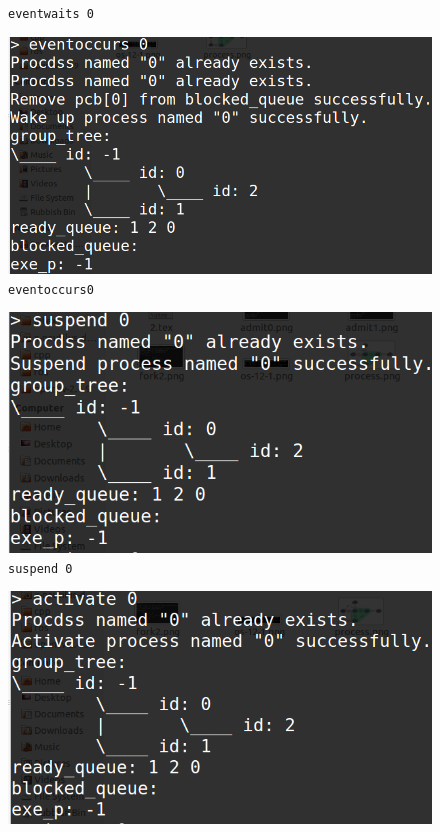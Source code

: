 \documentclass[11pt]{article}
\begin{document}
\begin{center}
\begin{figure}[htbp]
\caption{\texttt{eventwaits 0}}
\label{fig: eventwaits0}
\end{figure}
\begin{figure}[htbp]
\includegraphics[width=\textwidth]{eventoccurs0.png}
\caption{\texttt{eventoccurs0}}
\label{fig: eventoccurs0}
\end{figure}
\begin{figure}[htbp]
\includegraphics[width=\textwidth]{suspend0.png}
\caption{\texttt{suspend 0}}
\label{fig: suspend0}
\end{figure}
\begin{figure}[htbp]
\includegraphics[width=\textwidth]{activate0.png}

\end{figure}
\end{center}
\end{document}
